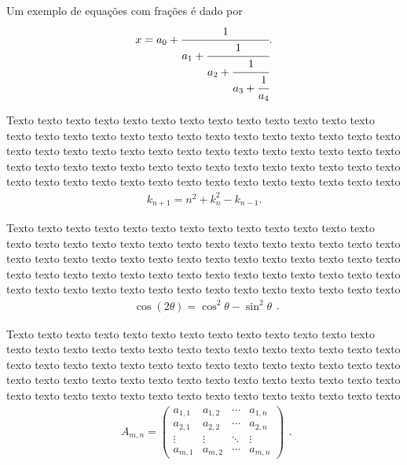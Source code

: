 Um exemplo de equações com frações é dado por
\begin{equation}
	\label{eq:fracao}
		\begin{aligned}
			x = a_0 + \cfrac{1}{a_1
				+ \cfrac{1}{a_2
					+ \cfrac{1}{a_3 + \cfrac{1}{a_4} } } }.
		\end{aligned}
	\end{equation}

Texto texto texto texto texto texto texto texto texto texto texto texto texto texto texto texto texto texto texto texto texto texto texto texto texto texto texto texto texto texto texto texto texto texto texto texto texto texto texto texto texto texto texto texto texto texto texto texto texto texto texto texto texto texto texto texto texto texto texto texto texto texto texto texto texto texto texto texto texto
	\begin{equation}
		\begin{aligned}
			k_{n+1} = n^2 + k_n^2 - k_{n-1}.
		\end{aligned}
	\end{equation}
	
Texto texto texto texto texto texto texto texto texto texto texto texto texto texto texto texto texto texto texto texto texto texto texto texto texto texto texto texto texto texto texto texto texto texto texto texto texto texto texto texto texto texto texto texto texto texto texto texto texto texto texto texto texto texto texto texto texto texto texto texto texto texto texto texto texto texto texto texto texto
	\begin{equation}
	\label{eq:trigo}
		\begin{aligned}
			\cos (2\theta) = \cos^2 \theta - \sin^2 \theta
		\end{aligned}.
	\end{equation}
	
Texto texto texto texto texto texto texto texto texto texto texto texto texto texto texto texto texto texto texto texto texto texto texto texto texto texto texto texto texto texto texto texto texto texto texto texto texto texto texto texto texto texto texto texto texto texto texto texto texto texto texto texto texto texto texto texto texto texto texto texto texto texto texto texto texto texto texto texto texto
	\begin{equation}
	\label{eq:matriz}
		\begin{aligned}
			A_{m,n} =
			\begin{pmatrix}
			a_{1,1} & a_{1,2} & \cdots & a_{1,n} \\
			a_{2,1} & a_{2,2} & \cdots & a_{2,n} \\
			\vdots  & \vdots  & \ddots & \vdots  \\
			a_{m,1} & a_{m,2} & \cdots & a_{m,n}
			\end{pmatrix}
		\end{aligned}.
	\end{equation}

